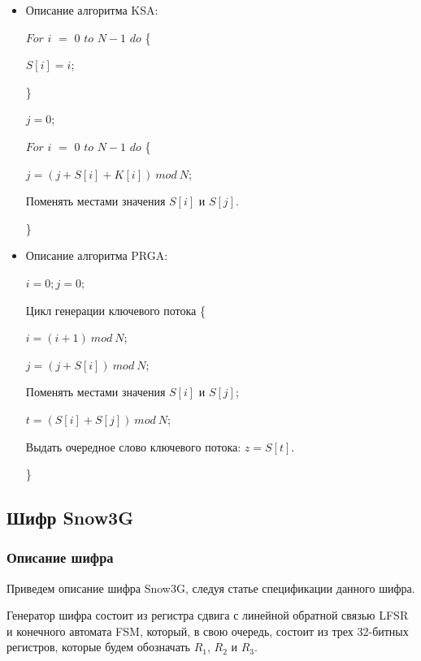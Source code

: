 \documentclass{./civarticle}
\begin{document}
\begin{itemize}
    \item Описание алгоритма KSA:

    $For$ $i$ $=$ $0$ $to$ $N-1$ $do$ \{ 
    
    \hspace{0.5cm}$S[i] = i$;
    
    \}    
    
    $j = 0$;

    $For$ $i$ $=$ $0$ $to$ $N-1$ $do$ \{ 
    
    \hspace{0.5cm}$j = (j + S[i] + K[i])~mod~N$;

    \hspace{0.5cm} Поменять местами значения $S[i]$ и $S[j]$.
    
    \} 

    \item Описание алгоритма PRGA:

    $i = 0; j = 0;$

    Цикл генерации ключевого потока \{
    
    \hspace{0.5cm}$i = (i + 1)~mod~N$;

    \hspace{0.5cm}$j = (j + S[i])~mod~N$;

    \hspace{0.5cm}Поменять местами значения $S[i]$ и $S[j]$;

    \hspace{0.5cm}$t = (S[i] + S[j])~mod~N$;

    \hspace{0.5cm}Выдать очередное слово ключевого потока: $z = S[t]$.
    
    \}
\end{itemize}


\subsection{Шифр Snow3G}

\subsubsection{Описание шифра}
Приведем описание шифра Snow3G, следуя статье \cite{snow3g_1} спецификации данного шифра.

Генератор шифра состоит из регистра сдвига с линейной обратной связью LFSR и конечного автомата FSM, который, в свою очередь, состоит из трех 32-битных регистров, которые будем обозначать $R_1$, $R_2$ и $R_3$. 
\end{document}
